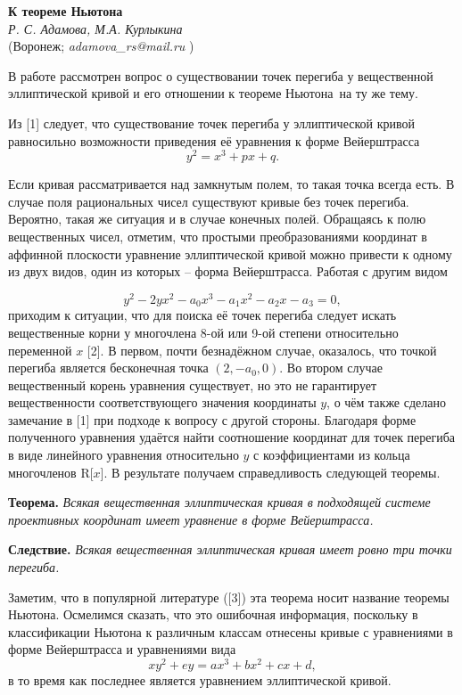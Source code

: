 
\begin{center}{ \bf  К \glqq теореме Ньютона\grqq}\\
	{\it Р. С. Адамова, М.А. Курлыкина } \\
	(Воронеж; {\it adamova\_rs@mail.ru} )
\end{center}


В работе рассмотрен вопрос о существовании точек перегиба у вещественной эллиптической кривой и его отношении к \glqq теореме Ньютона\grqq \, на ту же тему.

Из [1] следует, что существование точек перегиба у эллиптической кривой равносильно возможности приведения её уравнения к форме Вейерштрасса
$$y^2=x^3+px+q.$$

Если кривая рассматривается над замкнутым полем, то такая точка всегда есть. В случае поля рациональных чисел существуют кривые без точек перегиба. Вероятно, такая же ситуация и в случае конечных полей. Обращаясь к полю вещественных чисел, отметим, что простыми преобразованиями координат в аффинной плоскости уравнение эллиптической кривой можно привести к одному из двух видов, один из которых -- форма Вейерштрасса. Работая с другим видом

$$y^2-2yx^2-a_0x^3-a_1x^2-a_2x-a_3=0,$$
приходим к ситуации, что для поиска её точек перегиба следует искать вещественные корни у многочлена 8-ой или 9-ой степени относительно переменной  $x$ [2]. В первом, почти безнадёжном случае, оказалось, что точкой перегиба является бесконечная точка $(2, - a_0, 0).$ Во втором случае вещественный корень уравнения существует, но это не гарантирует вещественности соответствующего значения координаты $y$, о чём также сделано замечание в [1] при подходе к вопросу с другой стороны. Благодаря форме полученного уравнения удаётся найти соотношение координат для точек перегиба в виде линейного уравнения относительно $y$ с коэффициентами из кольца многочленов R[$x$]. В результате получаем справедливость следующей теоремы.

\textbf{Теорема.} {\it Всякая вещественная эллиптическая кривая в подходящей системе проективных координат имеет ура\-в\-не\-ние в форме Вейерштрасса.}

\textbf{Следствие.} {\it Всякая вещественная эллиптическая кривая имеет ровно три точки перегиба.}

Заметим, что в популярной литературе ([3]) эта теорема носит название теоремы Ньютона. Осмелимся сказать, что это ошибочная информация, поскольку в классификации Ньютона к различным классам отнесены кривые с уравнениями в форме Вейерштрасса и уравнениями вида
$$xy^2+ey=ax^3+bx^2+cx+d,$$
в то время как последнее является уравнением эллиптической кривой.



